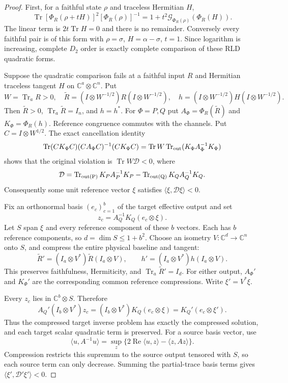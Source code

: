 \documentclass[11pt]{article}
\newcommand{\Tr}{\operatorname{Tr}}
\begin{document}
\begin{proof}
First, for a faithful state $\rho$ and traceless Hermitian $H$,
\[
 \Tr[\Phi_R(\rho+tH)]^2[\Phi_R(\rho)]^{-1}
 =1+t^2\mathcal G_{\Phi_R(\rho)}(\Phi_R(H)). \tag{2}
\]
The linear term is $2t\Tr H=0$ and there is no remainder. Conversely every
faithful pair is of this form with $\rho=\sigma$, $H=\alpha-\sigma$, $t=1$.
Since logarithm is increasing, complete $D_2$ order is exactly complete
comparison of these RLD quadratic forms.

Suppose the quadratic comparison fails at a faithful input $R$ and Hermitian
traceless tangent $H$ on $\mathbb C^a\otimes\mathbb C^n$. Put
\[
 W=\Tr_a R>0,\quad
 \widetilde R=(I\otimes W^{-1/2})R(I\otimes W^{-1/2}),\quad
 h=(I\otimes W^{-1/2})H(I\otimes W^{-1/2}).
\]
Then $\widetilde R>0$, $\Tr_a\widetilde R=I_n$, and $h=h^*$.
For $\Phi=P,Q$ put $A_\Phi=\Phi_R(\widetilde R)$ and
$K_\Phi=\Phi_R(h)$. Reference congruence commutes with the channels.
Put $C=I\otimes W^{1/2}$. The exact cancellation identity
\[
 \Tr (CK_\Phi C)(CA_\Phi C)^{-1}(CK_\Phi C)
 =\Tr W\Tr_{\rm out}(K_\Phi A_\Phi^{-1}K_\Phi)
\]
shows that the original violation is $\Tr W\mathcal D<0$, where
\[
 \mathcal D=\Tr_{\rm out(P)}K_PA_P^{-1}K_P
       -\Tr_{\rm out(Q)}K_QA_Q^{-1}K_Q.
\]
Consequently some unit reference vector $\xi$ satisfies
$\langle\xi,\mathcal D\xi\rangle<0$.

Fix an orthonormal basis $(e_c)_{c=1}^b$ of the target effective output and set
\[
 z_c=A_Q^{-1}K_Q(e_c\otimes\xi).
\]
Let $S$ span $\xi$ and every reference component of these $b$ vectors. Each has
$b$ reference components, so $d=\dim S\le1+b^2$. Choose an isometry
$V:\mathbb C^d\longrightarrow\mathbb C^n$ onto $S$, and compress the entire
physical baseline and tangent:
\[
 \widetilde R'=(I_a\otimes V^*)\widetilde R(I_a\otimes V),\qquad
 h'=(I_a\otimes V^*)h(I_a\otimes V).
\]
This preserves faithfulness, Hermiticity, and $\Tr_a\widetilde R'=I_d$.
For either output, $A_\Phi'$ and $K_\Phi'$ are the corresponding common
reference compressions. Write $\xi'=V^*\xi$.

Every $z_c$ lies in $\mathbb C^b\otimes S$. Therefore
\[
 A_Q'(I_b\otimes V^*)z_c
 =(I_b\otimes V^*)K_Q(e_c\otimes\xi)
 =K_Q'(e_c\otimes\xi').
\]
Thus the compressed target inverse problem has exactly the compressed solution,
and each target scalar quadratic term is preserved. For a source basis vector,
use
\[
 \langle u,A^{-1}u\rangle
 =\sup_z\{2\operatorname{Re}\langle u,z\rangle-\langle z,Az\rangle\}.
 \tag{3}
\]
Compression restricts this supremum to the source output tensored with $S$,
so each source term can only decrease. Summing the partial-trace basis terms
gives $\langle\xi',\mathcal D'\xi'\rangle<0$.


\end{proof}
\end{document}
